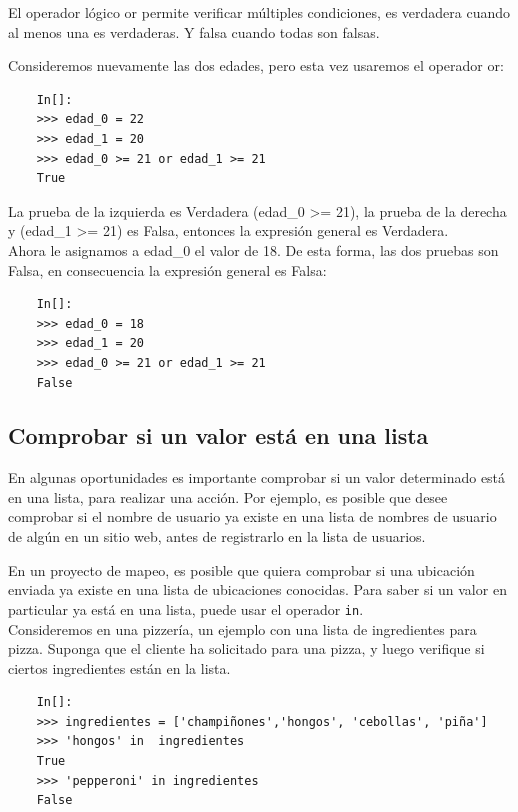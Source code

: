 El operador lógico  {\ttfamily or}  permite verificar múltiples condiciones,  es verdadera 
cuando al menos una es verdaderas. Y falsa cuando todas son falsas.

Consideremos nuevamente las dos edades, pero esta vez usaremos el operador {\ttfamily or}:


\begin{lstlisting}
	In[]:
	>>> edad_0 = 22
	>>> edad_1 = 20
	>>> edad_0 >= 21 or edad_1 >= 21
	True
\end{lstlisting}

La prueba de la izquierda es Verdadera ({\ttfamily  edad\_0 >= 21}), la prueba de la derecha y ({\ttfamily edad\_1 >= 21}) es Falsa, entonces la expresión general es Verdadera.\\ 


Ahora le asignamos a {\ttfamily  edad\_0} el valor de  18. De esta forma, las  dos pruebas son  Falsa, 
en consecuencia la expresión general es Falsa:
\begin{lstlisting}
	In[]:
	>>> edad_0 = 18
	>>> edad_1 = 20
	>>> edad_0 >= 21 or edad_1 >= 21
	False
\end{lstlisting}


\subsection{Comprobar si un valor está en una lista}

En algunas oportunidades es importante comprobar si un valor determinado está en una lista, para realizar una acción. Por ejemplo,
es posible que desee comprobar si el nombre de usuario ya existe en una lista de nombres de usuario  de algún en un sitio web,  antes de  registrarlo en la lista de usuarios.


En un proyecto de mapeo, es posible que quiera comprobar si una ubicación enviada ya existe en una lista de ubicaciones conocidas. Para saber si un valor en particular ya está en una lista, puede usar el operador
{\tt in}. \\

Consideremos en una pizzería, un ejemplo con una lista de ingredientes para pizza.  Suponga que el cliente ha solicitado para una pizza,
y luego verifique si ciertos ingredientes están en la lista.

\begin{lstlisting}
	In[]:
	>>> ingredientes = ['champiñones','hongos', 'cebollas', 'piña']
	>>> 'hongos' in  ingredientes
	True
	>>> 'pepperoni' in ingredientes
	False 
\end{lstlisting}

